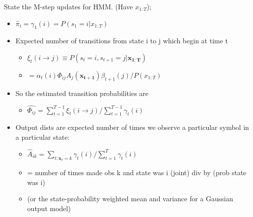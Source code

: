 \documentclass{article}
\begin{document}
State the M-step updates for HMM. (Have $x_{1:T}$); \begin{itemize} \item $\hat{\pi}_i = \gamma_1(i) = P(s_1=i|x_{1:T})$ \item Expected number of transitions from state i to j which begin at time t \begin{itemize} \item $\xi_t(i\rightarrow j) \equiv P(s_t=i, s_{t+1}=j|\mathbf{x_{1:T}})$ \item $=\alpha_t(i)\Phi_{ij}A_j(\mathbf{x_{t+1}})\beta_{t+1}(j)/P(x_{1:T})$ \end{itemize} \item So the estimated transition probabilities are \begin{itemize} \item $\hat{\Phi_{ij}}=\sum_{t=1}^{T-1}\xi_t(i\rightarrow j)/\sum_{t=1}^{T-1}\gamma_t(i)$ \end{itemize} \item Output dists are expected number of times we observe a particular symbol in a particular state: \begin{itemize} \item $\hat{A}_{ik}=\sum_{t:\mathbf{x}_t=k}\gamma_t(i)\big / \sum_{t=1}^T\gamma_t(i)$ \item = number of times made obs k and state was i (joint) div by (prob state was i) \item (or the state-probability weighted mean and variance for a Gaussian output model) \end{itemize} \end{itemize}
\end{document}
